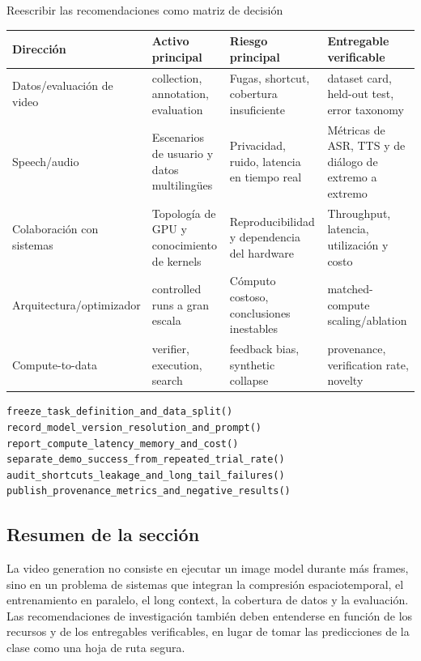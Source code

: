 
\begin{knowledgebox}{Reescribir las recomendaciones como matriz de decisión}
\small\sloppy
\begin{tabularx}{\textwidth}{L{0.17\textwidth} L{0.20\textwidth} L{0.20\textwidth} X}
\toprule
Dirección & Activo principal & Riesgo principal & Entregable verificable \\
\midrule
Datos/evaluación de video & collection, annotation, evaluation & Fugas, shortcut, cobertura insuficiente & dataset card, held-out test, error taxonomy \\
Speech/audio & Escenarios de usuario y datos multilingües & Privacidad, ruido, latencia en tiempo real & Métricas de ASR, TTS y de diálogo de extremo a extremo \\
Colaboración con sistemas & Topología de GPU y conocimiento de kernels & Reproducibilidad y dependencia del hardware & Throughput, latencia, utilización y costo \\
Arquitectura/optimizador & controlled runs a gran escala & Cómputo costoso, conclusiones inestables & matched-compute scaling/ablation \\
Compute-to-data & verifier, execution, search & feedback bias, synthetic collapse & provenance, verification rate, novelty \\
\bottomrule
\end{tabularx}
\end{knowledgebox}

\begin{lstlisting}[caption={Verificación previa a la publicación de un proyecto de investigación multimodal}]
freeze_task_definition_and_data_split()
record_model_version_resolution_and_prompt()
report_compute_latency_memory_and_cost()
separate_demo_success_from_repeated_trial_rate()
audit_shortcuts_leakage_and_long_tail_failures()
publish_provenance_metrics_and_negative_results()
\end{lstlisting}


\subsection{Resumen de la sección}

La video generation no consiste en ejecutar un image model durante más frames, sino en un problema de sistemas que integran la compresión espaciotemporal, el entrenamiento en paralelo, el long context, la cobertura de datos y la evaluación. Las recomendaciones de investigación también deben entenderse en función de los recursos y de los entregables verificables, en lugar de tomar las predicciones de la clase como una hoja de ruta segura.
